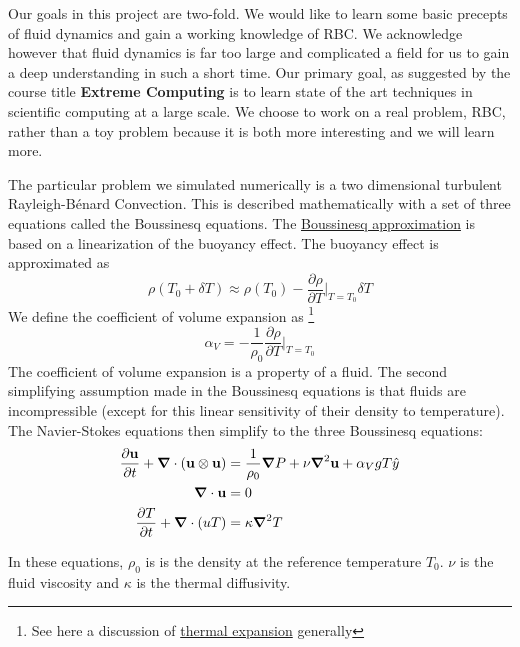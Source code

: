 \documentclass[11pt]{article} %
\newcommand{\uu}{\vectorbold{u}}
\begin{document}
Our goals in this project are two-fold.  
We would like to learn some basic precepts of fluid dynamics and gain a working knowledge of RBC.
We acknowledge however that fluid dynamics is far too large and complicated a field for us 
to gain a deep understanding in such a short time.
Our primary goal, as suggested by the course title \textbf{Extreme Computing}
is to learn state of the art techniques in scientific computing at a large scale.
We choose to work on a real problem, RBC, rather than a toy problem because
it is both more interesting and we will learn more.

The particular problem we simulated numerically is a two dimensional turbulent Rayleigh-B\'enard Convection.  
This is described mathematically with a set of three equations called the Boussinesq equations.
The \href{https://en.wikipedia.org/wiki/Boussinesq_approximation_(buoyancy)}{Boussinesq approximation} 
is based on a linearization of the buoyancy effect.
The buoyancy effect is approximated as 
$$ \rho(T_0 + \delta T) \approx \rho(T_0) - \frac{\partial \rho}{\partial T}\Bigr|_{T=T_0} \delta T$$
We define the coefficient of volume expansion as
\footnote{See here a discussion of  \href{https://en.wikipedia.org/wiki/Thermal_expansion}{thermal expansion} generally}
$$\alpha_V = -\frac{1}{\rho_0}\frac{\partial \rho}{\partial T}\Bigr|_{T=T_0}$$
The coefficient of volume expansion is a property of a fluid.
The second simplifying assumption made in the Boussinesq equations is that fluids are incompressible
(except for this linear sensitivity of their density to temperature).
The Navier-Stokes equations then simplify to the three Boussinesq equations:
\begin{align}
\frac{\partial \uu}{\partial t} + \grad \cdot (\uu \otimes \uu) &= \frac{1}{\rho_0} \grad P + \nu \grad^2 \uu + \alpha_V g T \hat{y} \\
\grad \cdot \uu &= 0 \\
\frac{\partial T}{\partial t} + \grad \cdot (uT) &= \kappa \grad^2 T
\end{align}

In these equations, $\rho_0$ is is the density at the reference temperature $T_0$.
$\nu$ is the fluid viscosity and $\kappa$ is the thermal diffusivity.
\end{document}
